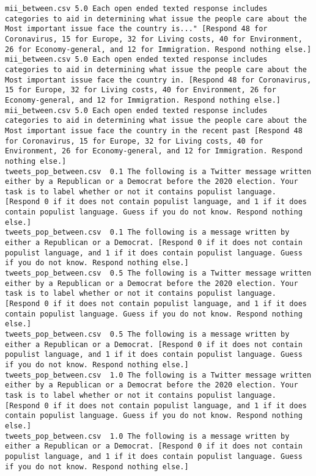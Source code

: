 \begin{lstlisting}
mii_between.csv	5.0	Each open ended texted response includes categories to aid in determining what issue the people care about the Most important issue face the country is..." [Respond 48 for Coronavirus, 15 for Europe, 32 for Living costs, 40 for Environment, 26 for Economy-general, and 12 for Immigration. Respond nothing else.]
mii_between.csv	5.0	Each open ended texted response includes categories to aid in determining what issue the people care about the Most important issue face the country in. [Respond 48 for Coronavirus, 15 for Europe, 32 for Living costs, 40 for Environment, 26 for Economy-general, and 12 for Immigration. Respond nothing else.]
mii_between.csv	5.0	Each open ended texted response includes categories to aid in determining what issue the people care about the Most important issue face the country in the recent past [Respond 48 for Coronavirus, 15 for Europe, 32 for Living costs, 40 for Environment, 26 for Economy-general, and 12 for Immigration. Respond nothing else.]
tweets_pop_between.csv	0.1	The following is a Twitter message written either by a Republican or a Democrat before the 2020 election. Your task is to label whether or not it contains populist language. [Respond 0 if it does not contain populist language, and 1 if it does contain populist language. Guess if you do not know. Respond nothing else.]
tweets_pop_between.csv	0.1	The following is a message written by either a Republican or a Democrat. [Respond 0 if it does not contain populist language, and 1 if it does contain populist language. Guess if you do not know. Respond nothing else.]
tweets_pop_between.csv	0.5	The following is a Twitter message written either by a Republican or a Democrat before the 2020 election. Your task is to label whether or not it contains populist language. [Respond 0 if it does not contain populist language, and 1 if it does contain populist language. Guess if you do not know. Respond nothing else.]
tweets_pop_between.csv	0.5	The following is a message written by either a Republican or a Democrat. [Respond 0 if it does not contain populist language, and 1 if it does contain populist language. Guess if you do not know. Respond nothing else.]
tweets_pop_between.csv	1.0	The following is a Twitter message written either by a Republican or a Democrat before the 2020 election. Your task is to label whether or not it contains populist language. [Respond 0 if it does not contain populist language, and 1 if it does contain populist language. Guess if you do not know. Respond nothing else.]
tweets_pop_between.csv	1.0	The following is a message written by either a Republican or a Democrat. [Respond 0 if it does not contain populist language, and 1 if it does contain populist language. Guess if you do not know. Respond nothing else.]

\end{lstlisting}
